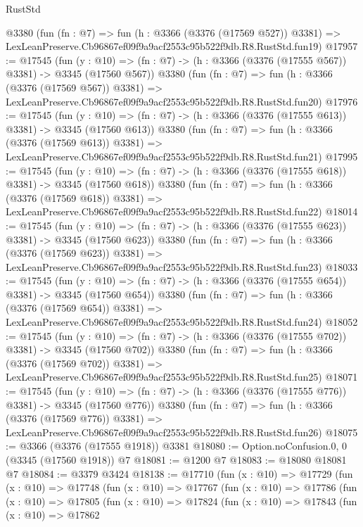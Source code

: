 \begin{lexlean}{RustStd}
\begin{coremodule}
    @3380
    (fun (fn : @7) =>
    fun (h : @3366 (@3376 (@17569 @527)) @3381) =>
    LexLeanPreserve.Cb96867ef09f9a9acf2553c95b522f9db.R8.RustStd.fun19)
@17957 := @17545
    (fun (y : @10) => (fn : @7) -> (h : @3366 (@3376 (@17555 @567)) @3381) -> @3345 (@17560 @567))
    @3380
    (fun (fn : @7) =>
    fun (h : @3366 (@3376 (@17569 @567)) @3381) =>
    LexLeanPreserve.Cb96867ef09f9a9acf2553c95b522f9db.R8.RustStd.fun20)
@17976 := @17545
    (fun (y : @10) => (fn : @7) -> (h : @3366 (@3376 (@17555 @613)) @3381) -> @3345 (@17560 @613))
    @3380
    (fun (fn : @7) =>
    fun (h : @3366 (@3376 (@17569 @613)) @3381) =>
    LexLeanPreserve.Cb96867ef09f9a9acf2553c95b522f9db.R8.RustStd.fun21)
@17995 := @17545
    (fun (y : @10) => (fn : @7) -> (h : @3366 (@3376 (@17555 @618)) @3381) -> @3345 (@17560 @618))
    @3380
    (fun (fn : @7) =>
    fun (h : @3366 (@3376 (@17569 @618)) @3381) =>
    LexLeanPreserve.Cb96867ef09f9a9acf2553c95b522f9db.R8.RustStd.fun22)
@18014 := @17545
    (fun (y : @10) => (fn : @7) -> (h : @3366 (@3376 (@17555 @623)) @3381) -> @3345 (@17560 @623))
    @3380
    (fun (fn : @7) =>
    fun (h : @3366 (@3376 (@17569 @623)) @3381) =>
    LexLeanPreserve.Cb96867ef09f9a9acf2553c95b522f9db.R8.RustStd.fun23)
@18033 := @17545
    (fun (y : @10) => (fn : @7) -> (h : @3366 (@3376 (@17555 @654)) @3381) -> @3345 (@17560 @654))
    @3380
    (fun (fn : @7) =>
    fun (h : @3366 (@3376 (@17569 @654)) @3381) =>
    LexLeanPreserve.Cb96867ef09f9a9acf2553c95b522f9db.R8.RustStd.fun24)
@18052 := @17545
    (fun (y : @10) => (fn : @7) -> (h : @3366 (@3376 (@17555 @702)) @3381) -> @3345 (@17560 @702))
    @3380
    (fun (fn : @7) =>
    fun (h : @3366 (@3376 (@17569 @702)) @3381) =>
    LexLeanPreserve.Cb96867ef09f9a9acf2553c95b522f9db.R8.RustStd.fun25)
@18071 := @17545
    (fun (y : @10) => (fn : @7) -> (h : @3366 (@3376 (@17555 @776)) @3381) -> @3345 (@17560 @776))
    @3380
    (fun (fn : @7) =>
    fun (h : @3366 (@3376 (@17569 @776)) @3381) =>
    LexLeanPreserve.Cb96867ef09f9a9acf2553c95b522f9db.R8.RustStd.fun26)
@18075 := @3366 (@3376 (@17555 @1918)) @3381
@18080 := Option.noConfusion.{0, 0} (@3345 (@17560 @1918)) @7
@18081 := @1200 @7
@18083 := @18080 @18081 @7
@18084 := @3379 @3424
@18138 := @17710
    (fun (x : @10) =>
    @17729
      (fun (x : @10) =>
      @17748
        (fun (x : @10) =>
        @17767
          (fun (x : @10) =>
          @17786
            (fun (x : @10) =>
            @17805
              (fun (x : @10) =>
              @17824
                (fun (x : @10) =>
                @17843
                  (fun (x : @10) =>
                  @17862

\end{coremodule}
\end{lexlean}
